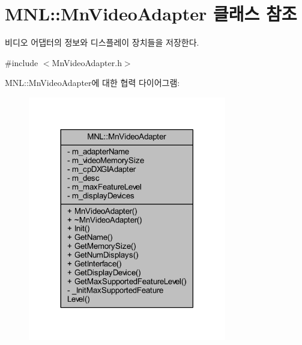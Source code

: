\hypertarget{class_m_n_l_1_1_mn_video_adapter}{}\section{M\+NL\+:\+:Mn\+Video\+Adapter 클래스 참조}
\label{class_m_n_l_1_1_mn_video_adapter}


비디오 어댑터의 정보와 디스플레이 장치들을 저장한다.  




{\ttfamily \#include $<$Mn\+Video\+Adapter.\+h$>$}



M\+NL\+:\+:Mn\+Video\+Adapter에 대한 협력 다이어그램\+:\nopagebreak
\begin{figure}[H]
\begin{center}
\leavevmode
\includegraphics[width=245pt]{class_m_n_l_1_1_mn_video_adapter__coll__graph}
\end{center}
\end{figure}
